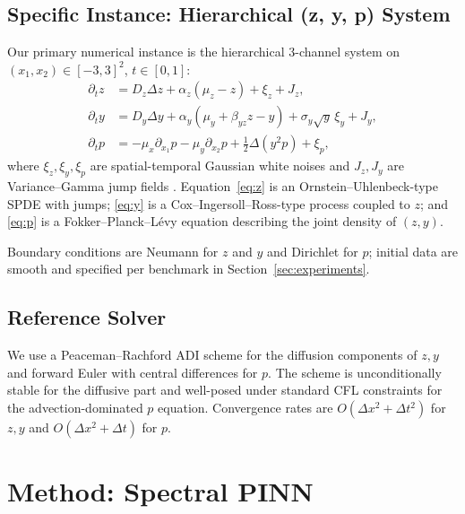 \documentclass[times,12pt]{elsarticle}
\newcommand{\bd}{\partial}
\begin{document}
\subsection{Specific Instance: Hierarchical (z, y, p) System}
\label{sec:setup-zyp}

Our primary numerical instance is the hierarchical 3-channel system on $(x_1, x_2) \in [-3, 3]^2$, $t \in [0, 1]$:
\begin{align}
\bd_t z &= D_z \Delta z + \alpha_z(\mu_z - z) + \xi_z + J_z, \label{eq:z}\\[4pt]
\bd_t y &= D_y \Delta y + \alpha_y(\mu_y + \beta_{yz} z - y) + \sigma_y \sqrt{y}\, \xi_y + J_y, \label{eq:y}\\[4pt]
\bd_t p &= -\mu_x \bd_{x_1} p - \mu_y \bd_{x_2} p + \tfrac{1}{2}\Delta(y^2 p) + \xi_p, \label{eq:p}
\end{align}
where $\xi_z, \xi_y, \xi_p$ are spatial-temporal Gaussian white noises and $J_z, J_y$ are Variance--Gamma jump fields \cite{MadanCarrChang1998}. Equation~\eqref{eq:z} is an Ornstein--Uhlenbeck-type SPDE with jumps; \eqref{eq:y} is a Cox--Ingersoll--Ross-type process coupled to $z$; and \eqref{eq:p} is a Fokker--Planck--L\'evy equation describing the joint density of $(z, y)$.

Boundary conditions are Neumann for $z$ and $y$ and Dirichlet for $p$;
initial data are smooth and specified per benchmark in
Section~\ref{sec:experiments}.

\subsection{Reference Solver}

We use a Peaceman--Rachford ADI scheme \cite{Peaceman1955} for the diffusion components of $z, y$ and forward Euler with central differences for $p$. The scheme is unconditionally stable for the diffusive part and well-posed under standard CFL constraints for the advection-dominated $p$ equation. Convergence rates are $O(\Delta x^2 + \Delta t^2)$ for $z, y$ and $O(\Delta x^2 + \Delta t)$ for $p$.


\section{Method: Spectral PINN}
\label{sec:method}
\end{document}
